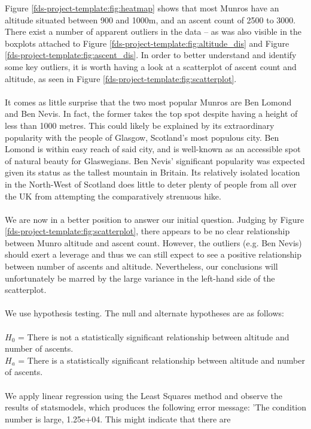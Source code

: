 \documentclass[11pt,a4paper]{article}
\begin{document}
Figure \ref{fds-project-template:fig:heatmap} shows that most Munros have an altitude situated between 900 and 1000m, and an ascent count of 2500 to 3000. There exist a number of apparent outliers in the data – as was also visible in the boxplots attached to Figure \ref{fds-project-template:fig:altitude_dis} and Figure \ref{fds-project-template:fig:ascent_dis}. In order to better understand and identify some key outliers, it is worth having a look at a scatterplot of ascent count and altitude, as seen in Figure \ref{fds-project-template:fig:scatterplot}. \\ \\
It comes as little surprise that the two most popular Munros are Ben Lomond and Ben Nevis. In fact, the former takes the top spot despite having a height of less than 1000 metres. This could likely be explained by its extraordinary popularity with the people of Glasgow, Scotland's most populous city. Ben Lomond is within easy reach of said city, and is well-known as an accessible spot of natural beauty for Glaswegians. Ben Nevis' significant popularity was expected given its status as the tallest mountain in Britain. Its relatively isolated location in the North-West of Scotland does little to deter plenty of people from all over the UK from attempting the comparatively strenuous hike. \\ \\
We are now in a better position to answer our initial question. Judging by Figure \ref{fds-project-template:fig:scatterplot}, there appears to be no clear relationship between Munro altitude and ascent count. However, the outliers (e.g. Ben Nevis) should exert a leverage and thus we can still expect to see a positive relationship between number of ascents and altitude. Nevertheless, our conclusions will unfortunately be marred by the large variance in the left-hand side of the scatterplot. \\ \\
We use hypothesis testing. The null and alternate hypotheses are as follows: \\ \\
$H_0$ = There is not a statistically significant relationship between altitude and number of ascents. \\
$H_a$ = There is a statistically significant relationship between altitude and number of ascents. \\ \\
We apply linear regression using the Least Squares method and observe the results of statsmodels, which produces the following error message: 'The condition number is large, 1.25e+04. This might indicate that there are
\end{document}

